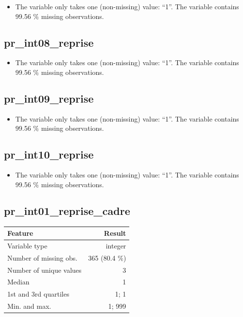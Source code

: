 \documentclass[
  letterpaper,
  DIV=11,
  numbers=noendperiod]{scrartcl}
\providecommand{\tightlist}{%
  \setlength{\itemsep}{0pt}\setlength{\parskip}{0pt}}
\begin{document}
\begin{itemize}
\tightlist
\item
  The variable only takes one (non-missing) value: ``1''. The variable
  contains 99.56 \% missing observations.
\end{itemize}

\fullline

\subsection{pr\_int08\_reprise}\label{pr_int08_reprise}

\begin{itemize}
\tightlist
\item
  The variable only takes one (non-missing) value: ``1''. The variable
  contains 99.56 \% missing observations.
\end{itemize}

\fullline

\subsection{pr\_int09\_reprise}\label{pr_int09_reprise}

\begin{itemize}
\tightlist
\item
  The variable only takes one (non-missing) value: ``1''. The variable
  contains 99.56 \% missing observations.
\end{itemize}

\fullline

\subsection{pr\_int10\_reprise}\label{pr_int10_reprise}

\begin{itemize}
\tightlist
\item
  The variable only takes one (non-missing) value: ``1''. The variable
  contains 99.56 \% missing observations.
\end{itemize}

\fullline

\subsection{pr\_int01\_reprise\_cadre}\label{pr_int01_reprise_cadre}

\bminione

\begin{longtable}[]{@{}lr@{}}
\toprule\noalign{}
Feature & Result \\
\midrule\noalign{}
\endhead
\bottomrule\noalign{}
\endlastfoot
Variable type & integer \\
Number of missing obs. & 365 (80.4 \%) \\
Number of unique values & 3 \\
Median & 1 \\
1st and 3rd quartiles & 1; 1 \\
Min. and max. & 1; 999 \\
\end{longtable}
\end{document}
